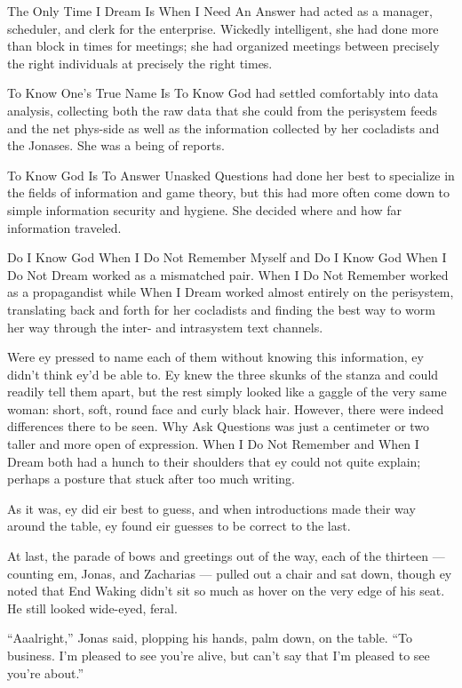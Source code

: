 The Only Time I Dream Is When I Need An Answer had acted as a manager, scheduler, and clerk for the enterprise. Wickedly intelligent, she had done more than block in times for meetings; she had organized meetings between precisely the right individuals at precisely the right times.

To Know One's True Name Is To Know God had settled comfortably into data analysis, collecting both the raw data that she could from the perisystem feeds and the net phys-side as well as the information collected by her cocladists and the Jonases. She was a being of reports.

To Know God Is To Answer Unasked Questions had done her best to specialize in the fields of information and game theory, but this had more often come down to simple information security and hygiene. She decided where and how far information traveled.

Do I Know God When I Do Not Remember Myself and Do I Know God When I Do Not Dream worked as a mismatched pair. When I Do Not Remember worked as a propagandist while When I Dream worked almost entirely on the perisystem, translating back and forth for her cocladists and finding the best way to worm her way through the inter- and intrasystem text channels.

Were ey pressed to name each of them without knowing this information, ey didn't think ey'd be able to. Ey knew the three skunks of the stanza and could readily tell them apart, but the rest simply looked like a gaggle of the very same woman: short, soft, round face and curly black hair. However, there were indeed differences there to be seen. Why Ask Questions was just a centimeter or two taller and more open of expression. When I Do Not Remember and When I Dream both had a hunch to their shoulders that ey could not quite explain; perhaps a posture that stuck after too much writing.

As it was, ey did eir best to guess, and when introductions made their way around the table, ey found eir guesses to be correct to the last.

At last, the parade of bows and greetings out of the way, each of the thirteen — counting em, Jonas, and Zacharias — pulled out a chair and sat down, though ey noted that End Waking didn't sit so much as hover on the very edge of his seat. He still looked wide-eyed, feral.

``Aaalright,'' Jonas said, plopping his hands, palm down, on the table. ``To business. I'm pleased to see you're alive, but can't say that I'm pleased to see you're about.''

